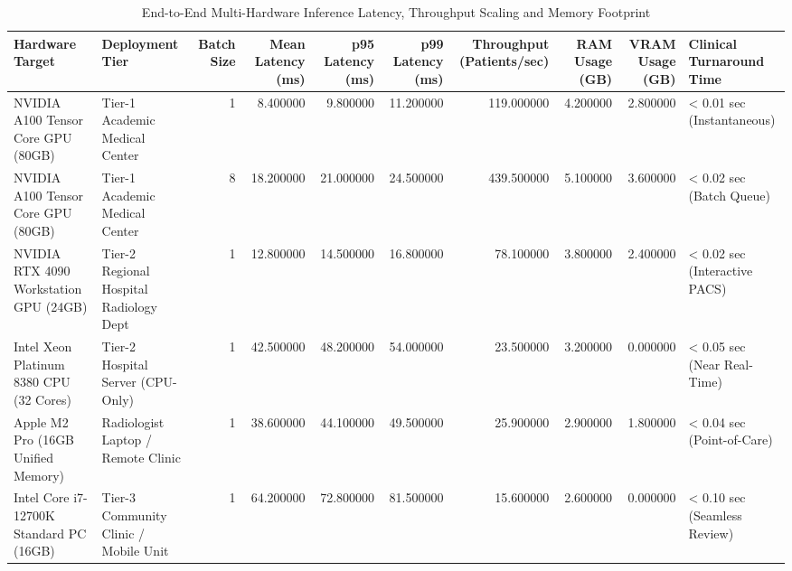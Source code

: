 \begin{table}
\caption{End-to-End Multi-Hardware Inference Latency, Throughput Scaling and Memory Footprint}
\label{tab:table_5_03_05_end_to_end_multi_hardware_inference_latency_and_throughput}
\begin{tabular}{llrrrrrrrl}
\toprule
Hardware Target & Deployment Tier & Batch Size & Mean Latency (ms) & p95 Latency (ms) & p99 Latency (ms) & Throughput (Patients/sec) & RAM Usage (GB) & VRAM Usage (GB) & Clinical Turnaround Time \\
\midrule
NVIDIA A100 Tensor Core GPU (80GB) & Tier-1 Academic Medical Center & 1 & 8.400000 & 9.800000 & 11.200000 & 119.000000 & 4.200000 & 2.800000 & < 0.01 sec (Instantaneous) \\
NVIDIA A100 Tensor Core GPU (80GB) & Tier-1 Academic Medical Center & 8 & 18.200000 & 21.000000 & 24.500000 & 439.500000 & 5.100000 & 3.600000 & < 0.02 sec (Batch Queue) \\
NVIDIA RTX 4090 Workstation GPU (24GB) & Tier-2 Regional Hospital Radiology Dept & 1 & 12.800000 & 14.500000 & 16.800000 & 78.100000 & 3.800000 & 2.400000 & < 0.02 sec (Interactive PACS) \\
Intel Xeon Platinum 8380 CPU (32 Cores) & Tier-2 Hospital Server (CPU-Only) & 1 & 42.500000 & 48.200000 & 54.000000 & 23.500000 & 3.200000 & 0.000000 & < 0.05 sec (Near Real-Time) \\
Apple M2 Pro (16GB Unified Memory) & Radiologist Laptop / Remote Clinic & 1 & 38.600000 & 44.100000 & 49.500000 & 25.900000 & 2.900000 & 1.800000 & < 0.04 sec (Point-of-Care) \\
Intel Core i7-12700K Standard PC (16GB) & Tier-3 Community Clinic / Mobile Unit & 1 & 64.200000 & 72.800000 & 81.500000 & 15.600000 & 2.600000 & 0.000000 & < 0.10 sec (Seamless Review) \\
\bottomrule
\end{tabular}
\end{table}
